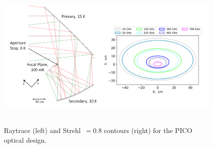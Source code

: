\documentclass[]{spie}  %
\begin{document}
\begin{figure} [ht]
\begin{center}
\includegraphics[height=7.5cm]{jpl_ray_strehl.png}
\end{center}
\caption { \label{fig:ray} \label{fig:strehl} 
Raytrace (left) and Strehl~$=0.8$ contours (right) for the PICO optical design.
}
\end{figure} 
\end{document}
